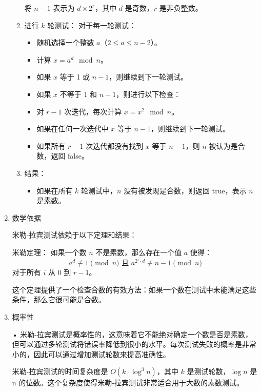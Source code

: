\begin{enumerate}
\begin{enumerate}
		            将 \( n-1 \) 表示为 \( d \times 2^r \)，其中 \( d \) 是奇数，\( r \) 是非负整数。
		      \item	进行 \( k \) 轮测试：
		            对于每一轮测试：
		            \begin{itemize}
			            \item	随机选择一个整数 \( a \)（\( 2 \leqslant a \leqslant n-2 \)）。
			            \item	计算 \( x = a^d \mod n \)。
			            \item	如果 \( x \) 等于 1 或 \( n-1 \)，则继续到下一轮测试。
			            \item	如果 \( x \) 不等于 1 和 \( n-1 \)，则进行以下检查：
			            \item	对 \( r-1 \) 次迭代，每次计算 \( x = x^2 \mod n \)。
			            \item	如果在任何一次迭代中 \( x \) 等于 \( n-1 \)，则继续到下一轮测试。
			            \item	如果所有 \( r-1 \) 次迭代都没有找到 \( x \) 等于 \( n-1 \)，则 \( n \) 被认为是合数，返回 false。
		            \end{itemize}
		      \item	结果：
		            \begin{itemize}
			            \item	如果在所有 \( k \) 轮测试中，\( n \) 没有被发现是合数，则返回 true，表示 \( n \) 是素数。
		            \end{itemize}
	      \end{enumerate}
	\item 数学依据

	      米勒-拉宾测试依赖于以下定理和结果：

	      米勒定理：
	      如果一个数 \( n \) 不是素数，那么存在一个值 \( a \) 使得：
	      \[ a^d \not\equiv 1 \pmod{n} \text{ 且 } a^{2^i \cdot d} \not\equiv n-1 \pmod{n} \]
	      对于所有 \( i \) 从 \( 0 \) 到 \( r-1 \)。

	      这个定理提供了一个检查合数的有效方法：如果一个数在测试中未能满足这些条件，那么它很可能是合数。
	\item 概率性

	      •	米勒-拉宾测试是概率性的，这意味着它不能绝对确定一个数是否是素数，但可以通过多轮测试将错误率降低到很小的水平。每次测试失败的概率是非常小的，因此可以通过增加测试轮数来提高准确性。

	      米勒-拉宾测试的时间复杂度是 \( O(k \cdot \log^3 n) \)，其中 \( k \) 是测试轮数，\( \log n \) 是  n  的位数。这个复杂度使得米勒-拉宾测试非常适合用于大数的素数测试。
\end{enumerate}

